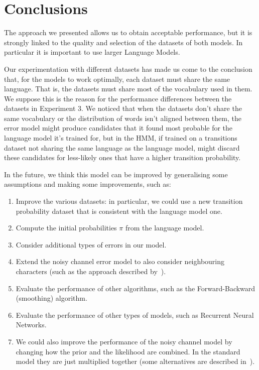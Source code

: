 \chapter{Conclusions}

The approach we presented allows us to obtain acceptable performance, but it is strongly linked to the quality 
and selection of the datasets of both models. In particular it is important to use larger Language Models.

Our experimentation with different datasets has made us come to the conclusion that, for the models to work 
optimally, each dataset must share the same language. That is, the datasets must share most of the vocabulary 
used in them. We suppose this is the reason for the performance differences between the datasets in Experiment 3. We  
noticed that when the datasets don't share the same vocabulary or the distribution of words isn't aligned between them, 
the error model might produce candidates that it found most probable for the language model it's trained for, but in 
the HMM, if trained on a transitions dataset not sharing the same language as the language model, might discard these 
candidates for less-likely ones that have a higher transition probability.

In the future, we think this model can be improved by generalising some assumptions and making some improvements, such 
as:
\begin{enumerate}
	\item Improve the various datasets: in particular, we could use a new transition probability dataset that is 
	consistent with the language model one.
	\item Compute the initial probabilities $\pi$ from the language model.
	\item Consider additional types of errors in our model.
	\item Extend the noisy channel error model to also consider neighbouring characters (such as the approach described 
	by~\cite{brill2000improved}).
	\item Evaluate the performance of other algorithms, such as the Forward-Backward (smoothing) algorithm.
	\item Evaluate the performance of other types of models, such as Recurrent Neural Networks.
	\item We could also improve the performance of the noisy channel model by changing how the prior and the 
	likelihood are combined. In the standard model they are just multiplied together (some alternatives are described 
	in~\cite{martin2009speech}).
\end{enumerate}

